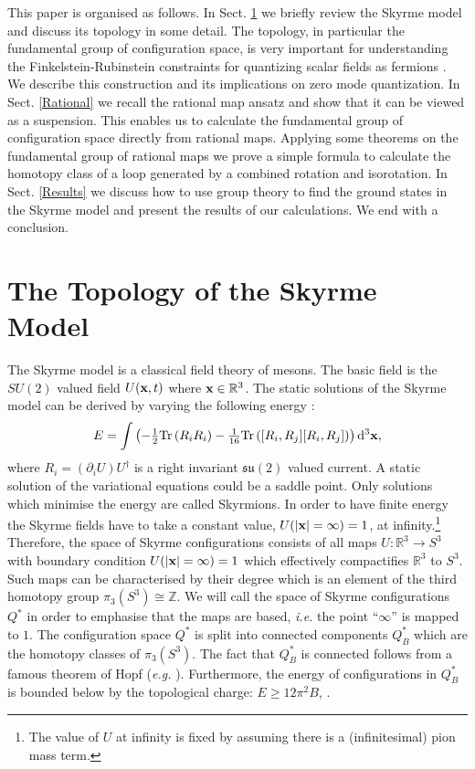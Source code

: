 \documentclass[a4paper,12pt]{article}
\begin{document}
This paper is organised as follows. In Sect. \ref{SkyrmeModel} we briefly
review the Skyrme model and discuss its topology in some detail. The
topology, in particular the fundamental group of configuration space, is
very important for understanding the Finkelstein-Rubinstein constraints
for quantizing scalar fields as fermions \cite{Finkelstein:1968hy}. We
describe this construction and its implications on zero mode quantization.
In Sect. \ref{Rational} we recall the rational map ansatz 
\cite{Houghton:1998kg} and show that it can be viewed as a suspension.
This enables us to calculate the fundamental group of configuration space
directly from rational maps. Applying some theorems on the fundamental
group of rational maps we prove a simple formula to calculate the
homotopy class of a loop generated by a combined rotation and isorotation.
In Sect. \ref{Results} we discuss how to use group theory to find the 
ground states in the Skyrme model and present the results of our 
calculations. We end with a conclusion.  


\section{The Topology of the Skyrme Model}
\label{SkyrmeModel}

The Skyrme model is a classical field theory of mesons.  The basic
field is the $SU(2)$ valued field $U({\bf x},t)$ where ${\bf x} \in
{\mathbb R}^3$.  The static solutions of the Skyrme model can be
derived by varying the following energy \cite{Houghton:1998kg}: 
%
\begin{equation}
\label{Estandard}
E = \int \left( -\tfrac{1}{2} {\rm Tr} \left( R_i R_i \right) -
\tfrac{1}{16} {\rm Tr} \left( [R_i, R_j][R_i,R_j] \right) \right) {\rm
d}^3 {\bf x}, 
\end{equation}
%
where $R_i = (\partial_i U) U^\dagger$ is a right invariant
${\mathfrak{su}}(2)$ valued current.  A static solution of the
variational equations could be a saddle point. Only solutions
which minimise the energy are called Skyrmions.  In order to
have finite energy the Skyrme fields have to take a constant value,
$U(|{\bf x}| = \infty) = 1$, at infinity.\footnote{The value of $U$ at 
infinity is fixed by assuming there is a (infinitesimal) pion mass term.}
%
Therefore, the space of Skyrme configurations consists of all 
maps $U: 
{\mathbb R}^3 \to S^3$ with boundary condition $U(|{\bf x}| = \infty)
= 1$ which effectively compactifies ${\mathbb R}^3$ to $S^3$. 
Such  maps can be characterised by their degree which
is an element of the third  homotopy group $\pi_3(S^3) \cong
{\mathbb Z}$. We will call the space of Skyrme configurations $Q^*$ in 
order to emphasise that the maps are based, {\it i.e.}  the point 
``$\infty$'' is mapped to
$1$. The configuration space $Q^*$ is split into
connected components $Q_B^*$ which are the homotopy classes of
$\pi_3(S^3)$. The fact that $Q_B^*$ is connected follows from a
famous theorem of Hopf ({\it e.g.} \cite{Hatcher:2002}).
Furthermore, the energy of configurations in $Q^*_B$ is bounded below by the 
topological charge: $E \ge 12 \pi^2 B$, \cite{Faddeev:1976pg}.
\end{document}
